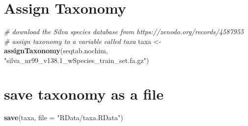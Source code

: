 \documentclass[
]{article}
\newenvironment{Shaded}{\begin{snugshade}}{\end{snugshade}}
\newcommand{\AttributeTok}[1]{\textcolor[rgb]{0.13,0.29,0.53}{#1}}
\newcommand{\CommentTok}[1]{\textcolor[rgb]{0.56,0.35,0.01}{\textit{#1}}}
\newcommand{\FunctionTok}[1]{\textcolor[rgb]{0.13,0.29,0.53}{\textbf{#1}}}
\newcommand{\NormalTok}[1]{#1}
\newcommand{\OtherTok}[1]{\textcolor[rgb]{0.56,0.35,0.01}{#1}}
\newcommand{\StringTok}[1]{\textcolor[rgb]{0.31,0.60,0.02}{#1}}
\begin{document}
\hypertarget{assign-taxonomy}{%
\section{Assign Taxonomy}\label{assign-taxonomy}}

\begin{Shaded}
\begin{Highlighting}[]
\CommentTok{\# download the Silva species database from https://zenodo.org/records/4587955}
\CommentTok{\# assign taxonomy to a variable called taxa}
\NormalTok{taxa }\OtherTok{\textless{}{-}} \FunctionTok{assignTaxonomy}\NormalTok{(seqtab.nochim, }\StringTok{"silva\_nr99\_v138.1\_wSpecies\_train\_set.fa.gz"}\NormalTok{)}
\end{Highlighting}
\end{Shaded}

\hypertarget{save-taxonomy-as-a-file}{%
\section{save taxonomy as a file}\label{save-taxonomy-as-a-file}}

\begin{Shaded}
\begin{Highlighting}[]
\FunctionTok{save}\NormalTok{(taxa, }\AttributeTok{file =} \StringTok{"RData/taxa.RData"}\NormalTok{)}
\end{Highlighting}
\end{Shaded}
\end{document}
